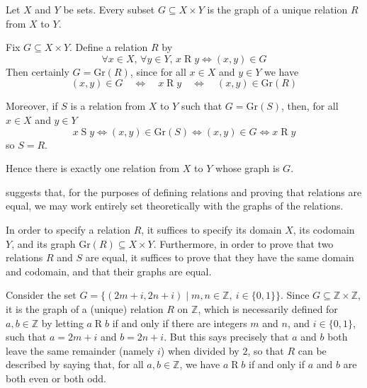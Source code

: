 \begin{theorem}
\label{thmRelationsAsSubsets}
Let $X$ and $Y$ be sets. Every subset $G \subseteq X \times Y$ is the graph of a unique relation $R$ from $X$ to $Y$.
\end{theorem}
\begin{cproof}
Fix $G \subseteq X \times Y$. Define a relation $R$ by
\[ \forall x \in X,\, \forall y \in Y,\, x \mathbin{R} y \Leftrightarrow (x,y) \in G \]
Then certainly $G = \mathrm{Gr}(R)$, since for all $x \in X$ and $y \in Y$ we have
\[ (x,y) \in G \quad \Leftrightarrow \quad x \mathrel{R} y \quad \Leftrightarrow \quad (x,y) \in \mathrm{Gr}(R) \]

Moreover, if $S$ is a relation from $X$ to $Y$ such that $G=\mathrm{Gr}(S)$, then, for all $x \in X$ and $y \in Y$ 
\[ x \mathrel{S} y \Leftrightarrow (x,y) \in \mathrm{Gr}(S) \Leftrightarrow (x,y) \in G \Leftrightarrow x \mathrel{R} y \]
so $S=R$.

Hence there is exactly one relation from $X$ to $Y$ whose graph is $G$.
\end{cproof}

 suggests that, for the purposes of defining relations and proving that relations are equal, we may work entirely set theoretically with the graphs of the relations.

\begin{strategy}
\label{strRelationsAndGraphs}
In order to specify a relation $R$, it suffices to specify its domain $X$, its codomain $Y$, and its graph $\mathrm{Gr}(R) \subseteq X \times Y$. Furthermore, in order to prove that two relations $R$ and $S$ are equal, it suffices to prove that they have the same domain and codomain, and that their graphs are equal.
\end{strategy}

\begin{example}
Consider the set $G = \{ (2m+i, 2n+i) \mid m,n \in \mathbb{Z},~ i \in \{ 0,1 \} \}$. Since $G \subseteq \mathbb{Z} \times \mathbb{Z}$, it is the graph of a (unique) relation $R$ on $\mathbb{Z}$, which is necessarily defined for $a,b \in \mathbb{Z}$ by letting $a \mathrel{R} b$ if and only if there are integers $m$ and $n$, and $i \in \{0,1\}$, such that $a=2m+i$ and $b=2n+i$. But this says precisely that $a$ and $b$ both leave the same remainder (namely $i$) when divided by $2$, so that $R$ can be described by saying that, for all $a,b \in \mathbb{Z}$, we have $a \mathrel{R} b$ if and only if $a$ and $b$ are both even or both odd.
\end{example}

